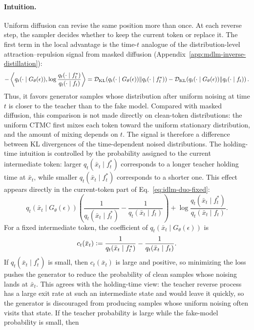 \begin{reviewblock}
\paragraph{Intuition.}
Uniform diffusion can revise the same position more than once. At each reverse
step, the sampler decides whether to keep the current token or replace it.
The first term in the local advantage is the time-$t$ analogue of the
distribution-level attraction--repulsion signal from masked diffusion
(Appendix~\ref{app:mdlm-inverse-distillation}):
\begingroup\small
\[
-\left\langle q_t(\cdot\mid G_\theta(\epsilon)),
\log\frac{q_t(\cdot\mid f_t^*)}{q_t(\cdot\mid f_t)}\right\rangle
=
\mathcal{D}_{\mathrm{KL}}\!\left(q_t(\cdot\mid G_\theta(\epsilon))\|q_t(\cdot\mid f_t^*)\right)
-
\mathcal{D}_{\mathrm{KL}}\!\left(q_t(\cdot\mid G_\theta(\epsilon))\|q_t(\cdot\mid f_t)\right).
\]
\endgroup
Thus, it favors generator samples whose distribution after uniform noising at
time $t$ is closer to the teacher than to the fake model. Compared with masked
diffusion, this comparison is not made directly on clean-token distributions:
the uniform CTMC first mixes each token toward the uniform stationary
distribution, and the amount of mixing depends on $t$. The signal is therefore
a difference between KL divergences of the time-dependent noised distributions.
The holding-time intuition is controlled by the probability assigned to the
current intermediate token: larger $q_t(\bar{x}_t\mid f_t^*)$ corresponds to a
longer teacher holding time at $\bar{x}_t$, while smaller
$q_t(\bar{x}_t\mid f_t^*)$ corresponds to a shorter one. This effect appears
directly in the current-token part of Eq.~\eqref{eq:idlm-duo-fixed}:
\[
q_t(\bar{x}_t\mid G_\theta(\epsilon))
\left(
\frac{1}{q_t(\bar{x}_t\mid f_t^*)}
-
\frac{1}{q_t(\bar{x}_t\mid f_t)}
\right)
+
\log\frac{q_t(\bar{x}_t\mid f_t^*)}{q_t(\bar{x}_t\mid f_t)}.
\]
For a fixed intermediate token, the coefficient of
$q_t(\bar{x}_t\mid G_\theta(\epsilon))$ is
\[
c_t(\bar{x}_t)
\vcentcolon=
\frac{1}{q_t(\bar{x}_t\mid f_t^*)}
-
\frac{1}{q_t(\bar{x}_t\mid f_t)}.
\]
If $q_t(\bar{x}_t\mid f_t^*)$ is small, then $c_t(\bar{x}_t)$ is large and
positive, so minimizing the loss pushes the generator to reduce the probability
of clean samples whose noising lands at $\bar{x}_t$. This agrees with the
holding-time view: the teacher reverse process has a large exit rate at such an
intermediate state and would leave it quickly, so the generator is discouraged
from producing samples whose uniform noising often visits that state. If the
teacher probability is large while the fake-model probability is small, then

\end{reviewblock}

